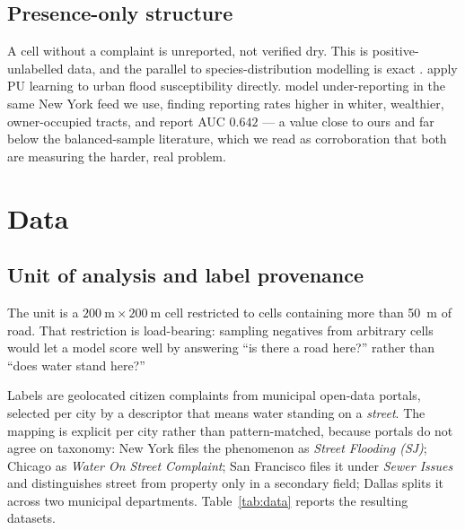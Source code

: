 \documentclass[11pt]{article}
\begin{document}
\subsection{Presence-only structure}
A cell without a complaint is unreported, not verified dry. This is
positive-unlabelled data, and the parallel to species-distribution modelling is
exact \citep{phillips2009,barbetmassin2012}. \citet{li2022} apply PU learning to
urban flood susceptibility directly. \citet{agostini2024} model under-reporting
in the same New York feed we use, finding reporting rates higher in whiter,
wealthier, owner-occupied tracts, and report AUC $0.642$ --- a value close to
ours and far below the balanced-sample literature, which we read as
corroboration that both are measuring the harder, real problem.

\section{Data}\label{sec:data}

\subsection{Unit of analysis and label provenance}
The unit is a $\SI{200}{\metre}\times\SI{200}{\metre}$ cell restricted to cells
containing more than \SI{50}{\metre} of road. That restriction is
load-bearing: sampling negatives from arbitrary cells would let a model score
well by answering ``is there a road here?'' rather than ``does water stand
here?''

Labels are geolocated citizen complaints from municipal open-data portals,
selected per city by a descriptor that means water standing on a
\emph{street}. The mapping is explicit per city rather than pattern-matched,
because portals do not agree on taxonomy: New York files the phenomenon as
\emph{Street Flooding (SJ)}; Chicago as \emph{Water On Street Complaint}; San
Francisco files it under \emph{Sewer Issues} and distinguishes street from
property only in a secondary field; Dallas splits it across two municipal
departments. Table~\ref{tab:data} reports the resulting datasets.
\end{document}
